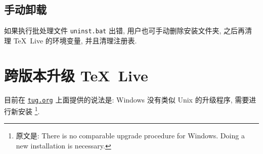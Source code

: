 \subsection{手动卸载}

如果执行批处理文件 \texttt{uninst.bat} 出错,
用户也可手动删除安装文件夹,
之后再清理 \TeX~Live 的环境变量,
并且清理注册表.

\section{跨版本升级 \TeX~Live}

目前在 \href{https://www.tug.org/texlive/upgrade.html}{\texttt{tug.org}}
上面提供的说法是:
Windows 没有类似 Unix 的升级程序,
需要进行新安装%
\footnote{原文是: There is no comparable upgrade procedure for Windows.
  Doing a new installation is necessary.}.
